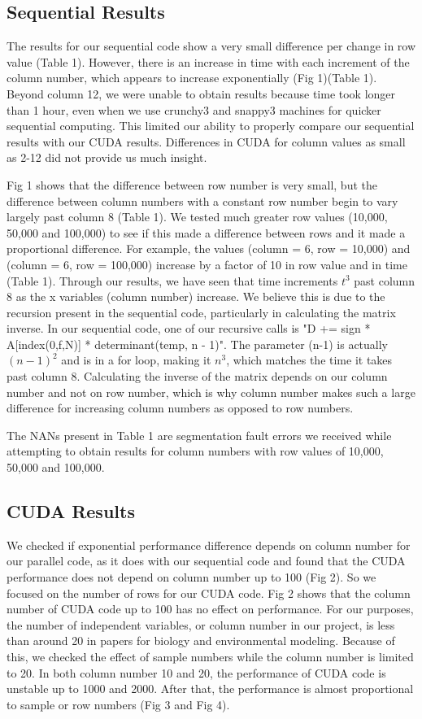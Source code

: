 \documentclass[letterpaper, 10 pt, conference]{ieeeconf}  %
\begin{document}
\subsection{Sequential Results}
The results for our sequential code show a very small difference per change in row value (Table 1). However, there is an increase in time with each increment of the column number, which appears to increase exponentially (Fig 1)(Table 1). Beyond column 12, we were unable to obtain results because time took longer than 1 hour, even when we use crunchy3 and snappy3 machines for quicker sequential computing. This limited our ability to properly compare our sequential results with our CUDA results. Differences in CUDA for column values as small as 2-12 did not provide us much insight.

Fig 1 shows that the difference between row number is very small, but the difference between column numbers with a constant row number begin to vary largely past column 8 (Table 1). We tested much greater row values (10,000, 50,000 and 100,000) to see if this made a difference between rows and it made a proportional difference. For example, the values (column = 6, row = 10,000) and (column = 6, row = 100,000) increase by a factor of 10 in row value and in time (Table 1). Through our results, we have seen that time increments $t^3$ past column 8 as the x variables (column  number) increase. We believe this is due to the recursion present in the sequential code, particularly in calculating the matrix inverse. In our sequential code, one of our recursive calls is "D += sign * A[index(0,f,N)] * determinant(temp, n - 1)". The parameter (n-1) is actually $(n-1)^2$ and is in a for loop, making it $n^3$, which matches the time it takes past column 8. Calculating the inverse of the matrix depends on our column number and not on row number, which is why column number makes such a large difference for increasing column numbers as opposed to row numbers. 

The NANs present in Table 1 are segmentation fault errors we received while attempting to obtain results for column numbers with row values of 10,000, 50,000 and 100,000.

\subsection{CUDA Results}

We checked if exponential performance difference depends on column number for our parallel code, as it does with our sequential code and found that the CUDA performance does not depend on column number up to 100 (Fig 2). So we focused on the number of rows for our CUDA code. Fig 2 shows that the column number of CUDA code up to 100 has no effect on performance. For our purposes, the number of independent variables, or column number in our project, is less than around 20 in papers for biology and environmental modeling. Because of this, we checked the effect of sample numbers while the column number is limited to 20. In both column number 10 and 20, the performance of CUDA code is unstable up to 1000 and 2000. After that, the performance is almost proportional to sample or row numbers (Fig 3 and Fig 4).
\end{document}
